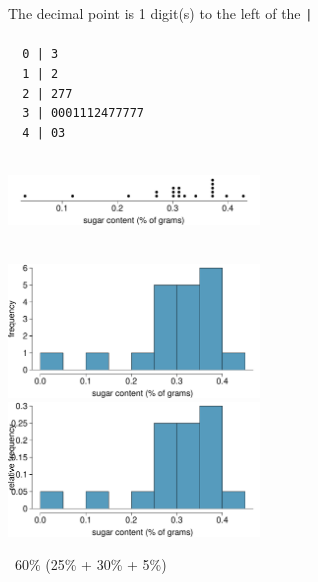 \begin{parts}
\item The decimal point is 1 digit(s) to the left of the \texttt{| \\
 \\
~~0 | 3 \\
~~1 | 2 \\
~~2 | 277 \\
~~3 | 0001112477777 \\
~~4 | 03}
\item \ \\
\includegraphics[width = 0.5\textwidth]{figures/cereal_sugar_dot}
\item \ \\
\includegraphics[width = 0.5\textwidth]{figures/cereal_sugar_hist} \\
\includegraphics[width = 0.5\textwidth]{figures/cereal_sugar_relhist}
\item ~60\% (25\% + 30\% + 5\%)
\end{parts}